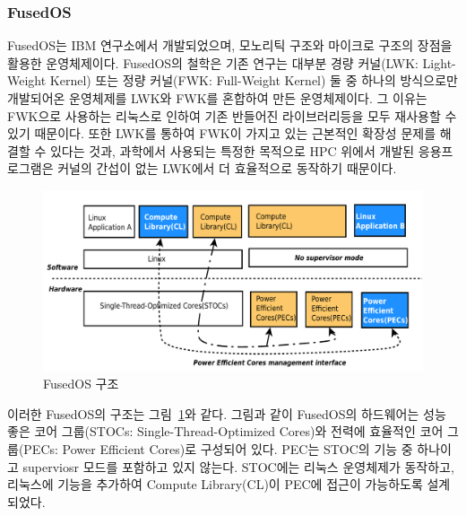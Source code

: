 \subsubsection{FusedOS}

FusedOS는 IBM 연구소에서 개발되었으며, 모노리틱 구조와 마이크로 구조의 장점을 활용한 운영체제이다.
FusedOS의 철학은 기존 연구는 대부분 경량 커널(LWK: Light-Weight Kernel) 또는 정량 커널(FWK:
Full-Weight Kernel) 둘 중 하나의 방식으로만 개발되어온 운영체제를 LWK와 FWK를 혼합하여 만든 운영체제이다.
그 이유는 FWK으로 사용하는 리눅스로 인하여 기존 반들어진 라이브러리등을 모두 재사용할 수 있기 때문이다.
또한 LWK를 통하여 FWK이 가지고 있는 근본적인 확장성 문제를 해결할 수 있다는 것과, 과학에서 사용되는 
특정한 목적으로 HPC 위에서 개발된 응용프로그램은 커널의 간섭이 없는 LWK에서 더 효율적으로 동작하기 때문이다. 
 
\begin{figure}[h!]
    \centering
    \includegraphics[width=1\textwidth]{fig/fusedos/fusedos}
    \caption{FusedOS 구조}
  \label{fig:FusedOS}
\end{figure}

이러한 FusedOS의 구조는 그림~\ref{fig:FusedOS}와 같다. 
그림과 같이 FusedOS의 하드웨어는 성능 좋은 코어 그룹(STOCs: Single-Thread-Optimized Cores)와
전력에 효율적인 코어 그룹(PECs: Power Efficient Cores)로 구성되어 있다.
PEC는 STOC의 기능 중 하나이고 superviosr 모드를 포함하고 있지 않는다. 
STOC에는 리눅스 운영체제가 동작하고, 리눅스에 기능을 추가하여 Compute Library(CL)이 PEC에 
접근이 가능하도록 설계되었다.

